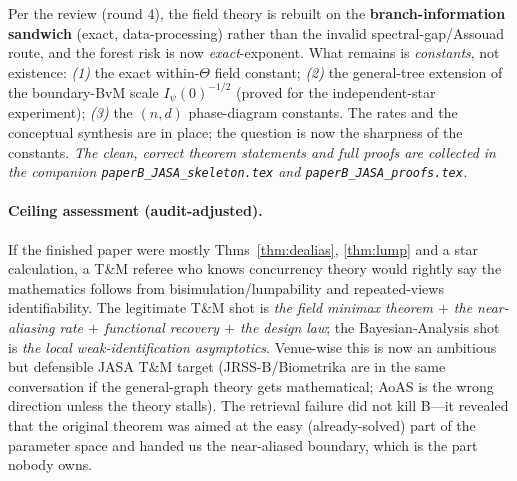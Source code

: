 \documentclass[11pt]{article}
\begin{document}
\noindent Per the review (round 4), the field theory is rebuilt on the \textbf{branch-information sandwich}
(exact, data-processing) rather than the invalid spectral-gap/Assouad route, and the forest risk is now
\emph{exact}-exponent. What remains is \emph{constants}, not existence: \emph{(1)} the exact within-$\Theta$ field
constant; \emph{(2)} the general-tree extension of the boundary-BvM scale $I_\psi(0)^{-1/2}$ (proved for the
independent-star experiment); \emph{(3)} the $(n,d)$ phase-diagram constants. The rates and the conceptual
synthesis are in place; the question is now the sharpness of the constants. \emph{The clean, correct theorem
statements and full proofs are collected in the companion \texttt{paperB\_JASA\_skeleton.tex} and
\texttt{paperB\_JASA\_proofs.tex}.}

\paragraph{Ceiling assessment (audit-adjusted).} If the finished paper were mostly Thms~\ref{thm:dealias},
\ref{thm:lump} and a star calculation, a T\&M referee who knows concurrency theory would rightly say the
mathematics follows from bisimulation/lumpability and repeated-views identifiability. The legitimate T\&M shot is
\emph{the field minimax theorem $+$ the near-aliasing rate $+$ functional recovery $+$ the design law}; the
Bayesian-Analysis shot is \emph{the local weak-identification asymptotics}. Venue-wise this is now an ambitious
but defensible JASA T\&M target (JRSS-B/Biometrika are in the same conversation if the general-graph theory gets
mathematical; AoAS is the wrong direction unless the theory stalls). The retrieval failure did not kill B---it
revealed that the original theorem was aimed at the easy (already-solved) part of the parameter space and handed
us the near-aliased boundary, which is the part nobody owns.
\end{document}
